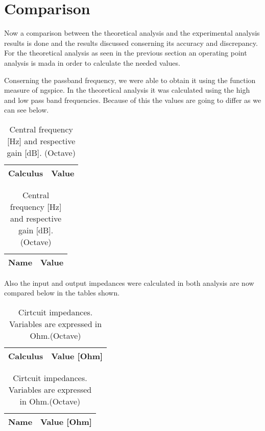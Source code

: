 \section{Comparison}
\label{section:comparison}


\par Now a comparison between the theoretical analysis and the experimental analysis results is done and the results discussed conserning its accuracy and discrepancy. For the theoretical analysis as seen in the previous section an operating point analysis is mada in order to calculate the needed values.
 
 \par Conserning the passband frequency, we were able to obtain it using the function measure of ngspice. In the theoretical analysis it was calculated using the high and low pass band frequencies. Because of this the values are going to differ as we can see below.

 \begin{table}[h]
\parbox{.45\linewidth}{
  \centering
  \begin{tabular}{|l|r|}
    \hline    
    {\bf Calculus} & {\bf Value} \\ \hline
    
  \end{tabular}
  \caption{Central frequency [Hz] and respective gain [dB]. (Ngspice)}} 
\parbox{.45\linewidth}{
 \centering
  \begin{tabular}{|l|r|}
    \hline    
    {\bf Name} & {\bf Value} \\ \hline
    
  \end{tabular}
  \caption{Central frequency [Hz] and respective gain [dB]. (Octave)}}
\end{table}

\par Also the input and output impedances were calculated in both analysis are now compared below in the tables shown.

\begin{table}[ht]
\parbox{.45\linewidth}{
  \centering
  \begin{tabular}{|l|r|}
    \hline    
    {\bf Calculus} & {\bf Value [Ohm]} \\ \hline
    
  \end{tabular}
  \caption{Cirtcuit impedances. Variables are expressed in Ohm.(Ngspice)}} 
\parbox{.45\linewidth}{
 \centering
  \begin{tabular}{|l|r|}
    \hline    
    {\bf Name} & {\bf Value [Ohm]} \\ \hline
    
  \end{tabular}
  \caption{Cirtcuit impedances. Variables are expressed in Ohm.(Octave)}}
\end{table}

